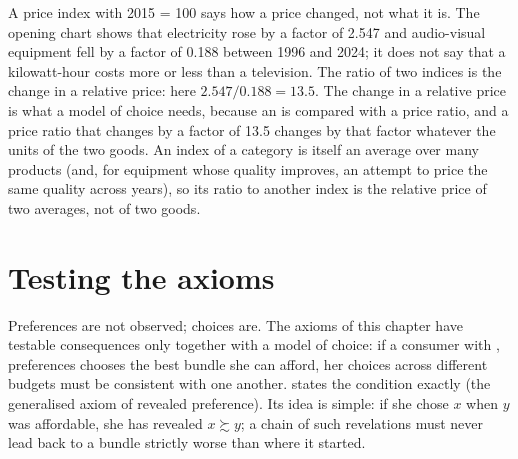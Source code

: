 \begin{measure}
A price index with 2015 = 100 says how a price changed, not what it is.
The opening chart shows that electricity rose by a factor of 2.547 and
audio-visual equipment fell by a factor of 0.188 between 1996 and 2024; %
it does not say that a kilowatt-hour costs more or less than a television.
The ratio of two indices is the change in a relative price: here
$2.547/0.188 = 13.5$. %
The change in a relative price is what a model of choice needs, because an
 is compared with a price ratio, and a price ratio that changes by a
factor of 13.5 changes by that factor whatever the units of the two goods.
An index of a category is itself an average over many products (and, for
equipment whose quality improves, an attempt to price the same quality
across years), so its ratio to another index is the relative price of two
averages, not of two goods.
\end{measure}

\section{Testing the axioms}\label{sec:b1:preferences-and-utility:testing}

Preferences are not observed; choices are. The axioms of this chapter have
testable consequences only together with a model of choice: if a consumer
with ,  preferences chooses the best bundle she can afford,
her choices across different budgets must be consistent with one another.
 states the condition exactly (the generalised
axiom of revealed preference). Its idea is simple: if she chose $x$ when $y$
was affordable, she has revealed $x \succsim y$; a chain of such revelations
must never lead back to a bundle strictly worse than where it started.

